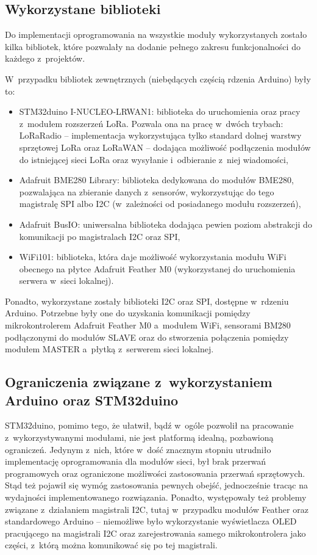 \FloatBarrier
\subsection{Wykorzystane biblioteki\label{sect:used-libs}} Do implementacji oprogramowania na wszystkie moduły
wykorzystanych zostało kilka bibliotek, które pozwalały na dodanie pełnego zakresu funkcjonalności do każdego
z~projektów.

W~przypadku bibliotek zewnętrznych (niebędących częścią rdzenia Arduino) były to:
\begin{itemize}[label=--]
    \item STM32duino I-NUCLEO-LRWAN1: biblioteka do uruchomienia oraz pracy z~modułem rozszerzeń LoRa. Pozwala ona na
          pracę w~dwóch trybach: LoRaRadio -- implementacja wykorzystująca tylko standard dolnej warstwy sprzętowej LoRa
          oraz LoRaWAN -- dodająca możliwość podłączenia modułów do istniejącej sieci LoRa oraz wysyłanie i~odbieranie
          z~niej wiadomości,
    \item Adafruit BME280 Library: biblioteka dedykowana do modułów BME280, pozwalająca na zbieranie danych z~sensorów,
          wykorzystując do tego magistralę SPI albo I2C (w~zależności od posiadanego modułu rozszerzeń),
    \item Adafruit BusIO: uniwersalna biblioteka dodająca pewien poziom abstrakcji do komunikacji po magistralach I2C
          oraz SPI,
    \item WiFi101: biblioteka, która daje możliwość wykorzystania modułu WiFi obecnego na płytce Adafruit Feather M0
          (wykorzystanej do uruchomienia serwera w~sieci lokalnej).
\end{itemize}
Ponadto, wykorzystane zostały biblioteki I2C oraz SPI, dostępne w~rdzeniu Arduino. Potrzebne były one do uzyskania
komunikacji pomiędzy mikrokontrolerem Adafruit Feather M0 a~modułem WiFi, sensorami BM280 podłączonymi do modułów SLAVE
oraz do stworzenia połączenia pomiędzy modułem MASTER a~płytką z~serwerem sieci lokalnej.

\FloatBarrier
\subsection{Ograniczenia związane z~wykorzystaniem Arduino oraz STM32duino\label{sect:framework-limits}} STM32duino,
pomimo tego, że ułatwił, bądź w~ogóle pozwolił na pracowanie z~wykorzystywanymi modułami, nie jest platformą idealną,
pozbawioną ograniczeń. Jedynym z~nich, które w~dość znacznym stopniu utrudniło implementację oprogramowania dla modułów
sieci, był brak przerwań programowych oraz ograniczone możliwości zastosowania przerwań sprzętowych. Stąd też pojawił
się wymóg zastosowania pewnych obejść, jednocześnie tracąc na wydajności implementowanego rozwiązania. Ponadto,
występowały też problemy związane z~działaniem magistrali I2C, tutaj w~przypadku modułów Feather oraz standardowego
Arduino -- niemożliwe było wykorzystanie wyświetlacza OLED pracującego na magistrali I2C oraz zarejestrowania samego
mikrokontrolera jako części, z~którą można komunikować się po tej magistrali.

